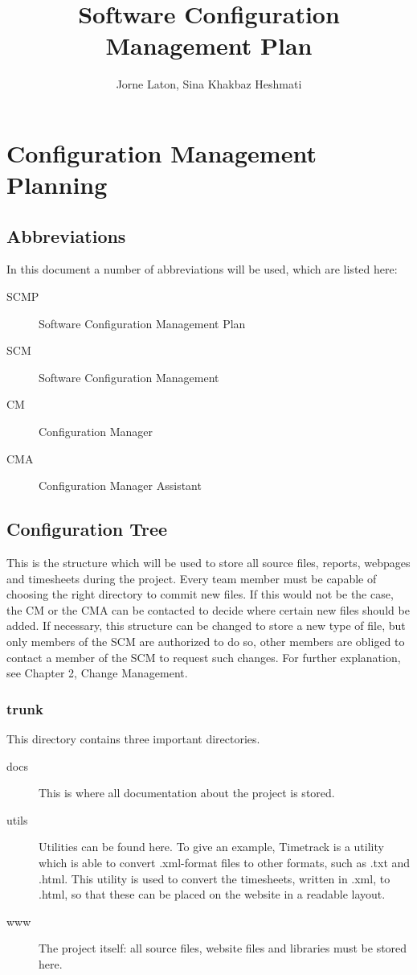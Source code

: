 \documentclass{report}
\author{Jorne Laton, Sina Khakbaz Heshmati}
\title{Software Configuration Management Plan}
\begin{document}
\maketitle
\chapter{Configuration Management Planning}
\section{Abbreviations}
In this document a number of abbreviations will be used, which are listed here:
\begin{description}
\item[SCMP]
Software Configuration Management Plan
\item[SCM]
Software Configuration Management
\item[CM]
Configuration Manager
\item[CMA]
Configuration Manager Assistant
\end{description}
\section{Configuration Tree}
This is the structure which will be used to store all source files, reports, webpages and timesheets during the project.
Every team member must be capable of choosing the right directory to commit new files.
If this would not be the case, the CM or the CMA can be contacted to decide where certain new files should be added.
If necessary, this structure can be changed to store a new type of file, but only members of the SCM are authorized to do so, other members are obliged to contact a member of the SCM to request such changes.
For further explanation, see Chapter 2, Change Management.
\subsection{trunk}
This directory contains three important directories.
\begin{description}
\item[docs]
This is where all documentation about the project is stored.
\item[utils]
Utilities can be found here.
To give an example, Timetrack is a utility which is able to convert .xml-format files to other formats, such as .txt and .html.
This utility is used to convert the timesheets, written in .xml, to .html, so that these can be placed on the website in a readable layout.
\item[www]
The project itself: all source files, website files and libraries must be stored here.
\end{description}
\end{document}

